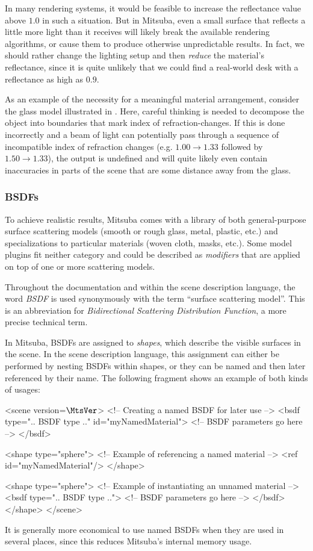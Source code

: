 In many rendering systems, it would be feasible to increase the 
reflectance value above $1.0$ in such a situation. But in Mitsuba, even a 
small surface that reflects a little more light than it receives will 
likely break the available rendering algorithms, or cause them to produce otherwise 
unpredictable results. In fact, we should rather change the lighting setup and
then \emph{reduce} the material's reflectance, since it is quite unlikely that 
we could find a real-world desk with a reflectance as high as $0.9$.

As an example of the necessity for a meaningful material arrangement, consider
the glass model illustrated in . Here, careful thinking 
is needed to decompose the object into boundaries that mark index of 
refraction-changes. If this is done incorrectly and a beam of light can
potentially pass through a sequence of incompatible index of refraction changes (e.g. $1.00\to 1.33$
followed by $1.50\to1.33$), the output is undefined and will quite likely
even contain inaccuracies in parts of the scene that are some distance
away from the glass.

\subsubsection*{BSDFs}
To achieve realistic results, Mitsuba comes with a library of both 
general-purpose surface scattering models (smooth or rough glass, metal,
plastic, etc.) and specializations to particular materials (woven cloth,
masks, etc.). Some model plugins fit neither category and could be described
as \emph{modifiers} that are applied on top of one or more scattering models. 

Throughout the documentation and within the scene description 
language,  the word \emph{BSDF} is used synonymously with the term ``surface
scattering model''. This is an abbreviation for \emph{Bidirectional 
Scattering Distribution Function}, a more precise technical 
term. 

In Mitsuba, BSDFs are 
assigned to \emph{shapes}, which describe the visible surfaces in
the scene. In the scene description language, this assignment can
either be performed by nesting BSDFs within shapes, or they can 
be named and then later referenced by their name. 
The following fragment shows an example of both kinds of usages:
\begin{xml}
<scene version=$\MtsVer$>
	<!-- Creating a named BSDF for later use -->
	<bsdf type=".. BSDF type .." id="myNamedMaterial">
		<!-- BSDF parameters go here -->
	</bsdf>

	<shape type="sphere">
		<!-- Example of referencing a named material -->
		<ref id="myNamedMaterial"/>
	</shape>

	<shape type="sphere">
		<!-- Example of instantiating an unnamed material -->
		<bsdf type=".. BSDF type ..">
			<!-- BSDF parameters go here -->
		</bsdf>
	</shape>
</scene>
\end{xml}
It is generally more economical to use named BSDFs when they
are used in several places, since this reduces Mitsuba's internal
memory usage.

